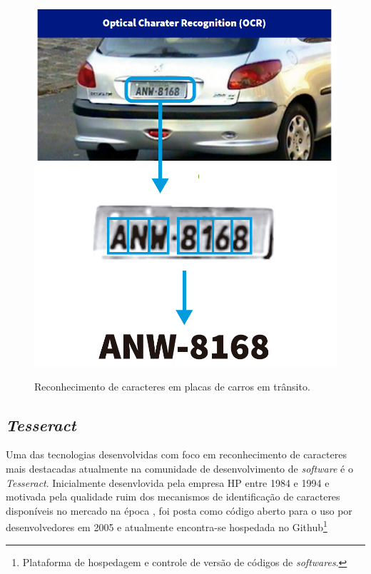 \begin{figure}[h]
  \centering
  \caption{Reconhecimento de caracteres em placas de carros em trânsito.}
  \includegraphics[scale=0.4]{figuras/ocr-placa-carro.png}
  \label{fig:ocr-placa-carro}
\end{figure}

\subsection{\textit{Tesseract}}

Uma das tecnologias desenvolvidas com foco em reconhecimento de caracteres mais destacadas atualmente na comunidade de desenvolvimento de \textit{software} é o \textit{Tesseract}. Inicialmente desenvlovida pela empresa HP entre 1984 e 1994 e motivada pela qualidade ruim dos mecanismos de identificação de caracteres disponíveis no mercado na época \cite{tesseract-overview}, foi posta como código aberto para o uso por desenvolvedores em 2005 e atualmente encontra-se hospedada no Github\footnote{Plataforma de hospedagem e controle de versão de códigos de \textit{softwares}.}


